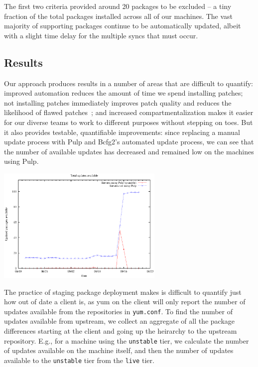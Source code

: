 The first two criteria provided around 20 packages to be excluded -- a
tiny fraction of the total packages installed across all of our
machines.  The vast majority of supporting packages continue to be
automatically updated, albeit with a slight time delay for the
multiple syncs that must occur.

\subsection{Results}

Our approach produces results in a number of areas that are difficult
to quantify: improved automation reduces the amount of time we spend
installing patches; not installing patches immediately improves patch
quality and reduces the likelihood of flawed patches~\cite{BACWWS02};
and increased compartmentalization makes it easier for our diverse
teams to work to different purposes without stepping on toes.  But it
also provides testable, quantifiable improvements: since replacing a
manual update process with Pulp and Bcfg2's automated update process,
we can see that the number of available updates has decreased and
remained low on the machines using Pulp.

\begin{center}
\includegraphics[width=8cm]{updates}
\end{center}

The practice of staging package deployment makes is difficult to
quantify just how out of date a client is, as yum on the client will
only report the number of updates available from the repositories in
\texttt{yum.conf}. To find the number of updates available from
upstream, we collect an aggregate of all the package differences
starting at the client and going up the heirarchy to the upstream
repository.  E.g., for a machine using the \texttt{unstable} tier, we
calculate the number of updates available on the machine itself, and
then the number of updates available to the \texttt{unstable} tier
from the \texttt{live} tier.

